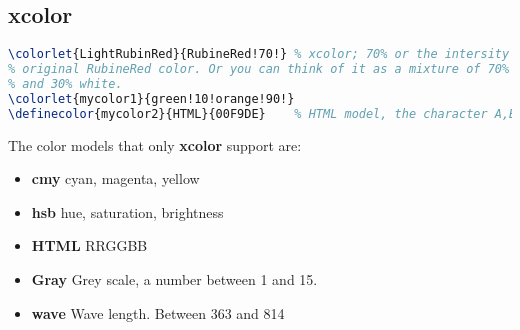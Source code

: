 \subsection{xcolor}
\begin{lstlisting}[language=TeX]
\colorlet{LightRubinRed}{RubineRed!70!}	% xcolor; 70% or the intersity of 
% original RubineRed color. Or you can think of it as a mixture of 70% RubineRed
% and 30% white.
\colorlet{mycolor1}{green!10!orange!90!}
\definecolor{mycolor2}{HTML}{00F9DE}	% HTML model, the character A,B,C,D,E and F must be upper-case.
\end{lstlisting}

The color models that only \textbf{xcolor} support are:
\begin{itemize}
    \item \textbf{cmy} cyan, magenta, yellow
    \item \textbf{hsb} hue, saturation, brightness
    \item \textbf{HTML} RRGGBB
    \item \textbf{Gray} Grey scale, a number between 1 and 15.
    \item \textbf{wave} Wave length. Between 363 and 814    	
\end{itemize}
